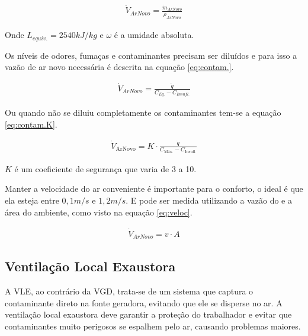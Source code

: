 \documentclass[acronym,symbols]{fei}
\begin{document}
\begin{equation} \label{eq:umidV}
\begin{aligned}
    \dot{V}_{ArNovo}=\frac{\dot{m}_{ArNovo}}{\rho_{ArNovo}}
\end{aligned}
\end{equation}

Onde $L_{equiv.}=2540 kJ/kg$ e $\omega$ é a umidade absoluta.

Os níveis de odores, fumaças e contaminantes precisam ser diluídos e para isso a vazão de ar novo necessária é descrita na equação \ref{eq:contam.}.

\begin{equation} \label{eq:contam.}
    \begin{aligned}
     \dot{V}_{ArNovo}=\frac{\dot{q}}{C_{Eq.}-C_{Insufl.}}
    \end{aligned}
\end{equation}

Ou quando não se diluiu completamente os contaminantes tem-se a equação \ref{eq:contam.K}.

\begin{equation} \label{eq:contam.K}
    \begin{aligned}
    \dot{V}_{\text{ArNovo}} = K \cdot \frac{\dot{q}}{C_{\text{Máx.}} - C_{\text{Insufl.}}}
    \end{aligned}
\end{equation}

$K$ é um coeficiente de segurança que varia de 3 a 10.

Manter a velocidade do ar conveniente é importante para o conforto, o ideal é que ela esteja entre $0,1 m/s$ e $1,2 m/s$. E pode ser medida utilizando a vazão do e a área do ambiente, como visto na equação \ref{eq:veloc}.

\begin{equation} \label{eq:veloc}
\begin{aligned}
    \dot{V}_{ArNovo}=v\cdot{A}
\end{aligned}
\end{equation}

\subsection{Ventilação Local Exaustora}

A VLE, ao contrário da VGD, trata-se de um sistema que captura o contaminante direto na fonte geradora, evitando que ele se disperse no ar. A ventilação local exaustora deve garantir a proteção do trabalhador e evitar que contaminantes muito perigosos se espalhem pelo ar, causando problemas maiores. 
\end{document}
